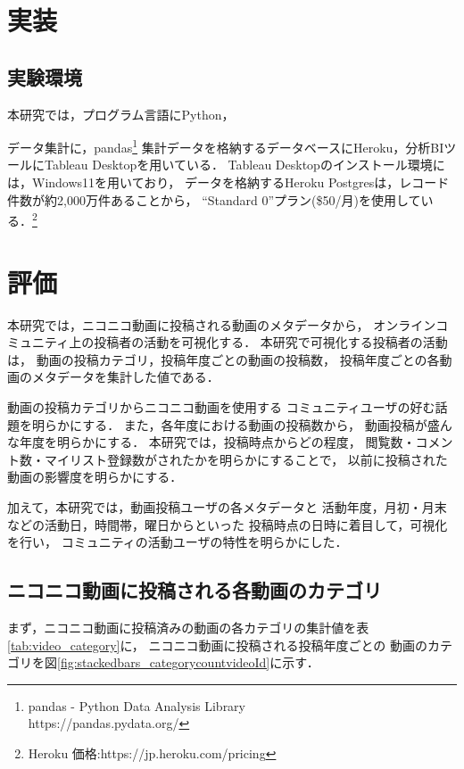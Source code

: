 \documentclass[submit,techrep,noauthor]{ipsj}
\begin{document}
\section{実装}
\subsection{実験環境}
本研究では，プログラム言語にPython，

データ集計に，pandas\footnote{pandas - Python Data Analysis Library\\https://pandas.pydata.org/}
集計データを格納するデータベースにHeroku，分析BIツールにTableau Desktopを用いている．
%
Tableau Desktopのインストール環境には，Windows11を用いており，
データを格納するHeroku Postgresは，レコード件数が約2,000万件あることから，
``Standard 0''プラン(\$50/月)を使用している．\footnote{Heroku 価格:https://jp.heroku.com/pricing}


\newpage

\section{評価}
本研究では，ニコニコ動画に投稿される動画のメタデータから，
オンラインコミュニティ上の投稿者の活動を可視化する．
%
本研究で可視化する投稿者の活動は，
動画の投稿カテゴリ，投稿年度ごとの動画の投稿数，
投稿年度ごとの各動画のメタデータを集計した値である．

動画の投稿カテゴリからニコニコ動画を使用する
コミュニティユーザの好む話題を明らかにする．
%
また，各年度における動画の投稿数から，
動画投稿が盛んな年度を明らかにする．
%
本研究では，投稿時点からどの程度，
閲覧数・コメント数・マイリスト登録数がされたかを明らかにすることで，
以前に投稿された動画の影響度を明らかにする．

加えて，本研究では，動画投稿ユーザの各メタデータと
活動年度，月初・月末などの活動日，時間帯，曜日からといった
投稿時点の日時に着目して，可視化を行い，
コミュニティの活動ユーザの特性を明らかにした．


\subsection{ニコニコ動画に投稿される各動画のカテゴリ}\label{simulation}

まず，ニコニコ動画に投稿済みの動画の各カテゴリの集計値を表\ref{tab:video_category}に，
ニコニコ動画に投稿される投稿年度ごとの
動画のカテゴリを図\ref{fig:stackedbars_categorycountvideoId}に示す．
\end{document}
